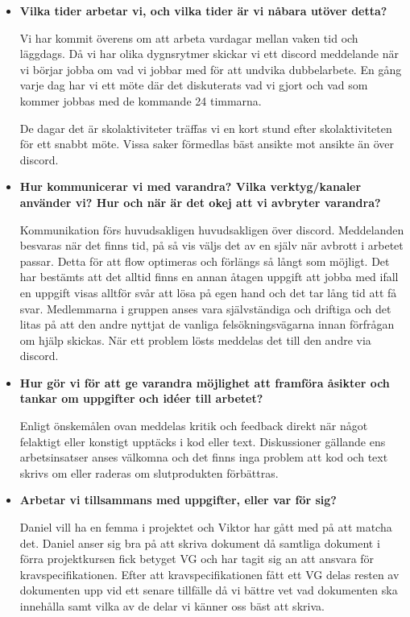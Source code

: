 \documentclass{mall}
\begin{document}
\begin{itemize}
\item \textbf{Vilka tider arbetar vi, och vilka tider är vi nåbara utöver detta?}

  Vi har kommit överens om att arbeta vardagar mellan vaken tid och läggdags. Då vi har olika dygnsrytmer skickar vi ett discord meddelande när vi börjar jobba om vad vi jobbar med för att undvika dubbelarbete. En gång varje dag har vi ett möte där det diskuterats vad vi gjort och vad som kommer jobbas med de kommande 24 timmarna.

  De dagar det är skolaktiviteter träffas vi en kort stund efter skolaktiviteten för ett snabbt möte. Vissa saker förmedlas bäst ansikte mot ansikte än över discord.

\item \textbf{Hur kommunicerar vi med varandra? Vilka verktyg/kanaler använder vi? Hur och när är det okej att vi avbryter varandra?}

  Kommunikation förs huvudsakligen huvudsakligen över discord. Meddelanden besvaras när det finns tid, på så vis väljs det av en själv när avbrott i arbetet passar. Detta för att flow optimeras och förlängs så långt som möjligt. Det har bestämts att det alltid finns en annan åtagen uppgift att jobba med ifall en uppgift visas alltför svår att lösa på egen hand och det tar lång tid att få svar.  Medlemmarna i gruppen anses vara självständiga och driftiga och det litas på att den andre nyttjat de vanliga felsökningsvägarna innan förfrågan om hjälp skickas. När ett problem lösts meddelas det till den andre via discord.


  \item \textbf{Hur gör vi för att ge varandra möjlighet att framföra åsikter och tankar om uppgifter och idéer till arbetet?}

Enligt önskemålen ovan meddelas kritik och feedback direkt när något felaktigt eller konstigt upptäcks i kod eller text. Diskussioner gällande ens arbetsinsatser anses välkomna och det finns inga problem att kod och text skrivs om eller raderas om slutprodukten förbättras.\\

\item \textbf{Arbetar vi tillsammans med uppgifter, eller var för sig?}

  Daniel vill ha en femma i projektet och Viktor har gått med på att matcha det. Daniel anser sig bra på att skriva dokument då samtliga dokument i förra projektkursen fick betyget VG och har tagit sig an att ansvara för kravspecifikationen. Efter att kravspecifikationen fått ett VG delas resten av dokumenten upp vid ett senare tillfälle då vi bättre vet vad dokumenten ska innehålla samt vilka av de delar vi känner oss bäst att skriva.



\end{itemize}
\end{document}
